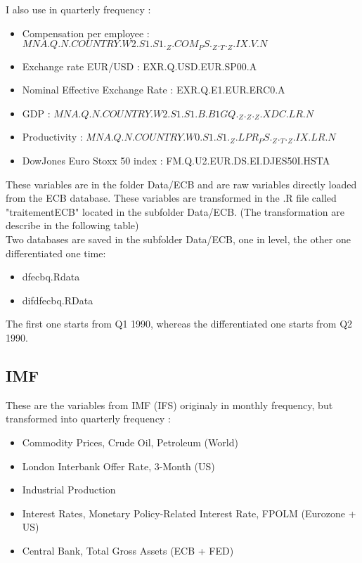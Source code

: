 \documentclass[11pt,a4paper]{article}
\begin{document}
I also use in quarterly frequency : 

\begin{itemize}
\item Compensation per employee : $MNA.Q.N.COUNTRY.W2.S1.S1._Z.COM_PS._Z._T._Z.IX.V.N$
\item Exchange rate EUR/USD : EXR.Q.USD.EUR.SP00.A
\item Nominal Effective Exchange Rate : EXR.Q.E1.EUR.ERC0.A
\item GDP : $MNA.Q.N.COUNTRY.W2.S1.S1.B.B1GQ._Z._Z._Z.XDC.LR.N$
\item Productivity : $MNA.Q.N.COUNTRY.W0.S1.S1._Z.LPR_PS._Z._T._Z.IX.LR.N$
\item DowJones Euro Stoxx 50 index : FM.Q.U2.EUR.DS.EI.DJES50I.HSTA

\end{itemize}

\vspace{0.5cm}

These variables are in the folder Data/ECB and are raw variables directly loaded from the ECB database. These variables are transformed in the .R file called "traitementECB" located in the subfolder Data/ECB. (The transformation are describe in the following table) \\

Two databases are saved in the subfolder Data/ECB, one in level, the other one differentiated one time: 

\begin{itemize}
\item dfecbq.Rdata 
\item difdfecbq.RData 
\end{itemize}

\vspace{0.5cm}

The first one starts from Q1 1990, whereas the differentiated one starts from Q2 1990.





\subsection{IMF}

These are the variables from IMF (IFS) originaly in monthly frequency, but transformed into quarterly frequency :
\begin{itemize}
\item Commodity Prices, Crude Oil, Petroleum (World)
\item London Interbank Offer Rate, 3-Month (US)
\item Industrial Production
\item Interest Rates, Monetary Policy-Related Interest Rate, FPOLM (Eurozone + US)
\item Central Bank, Total Gross Assets (ECB + FED)
\end{itemize}
\end{document}
